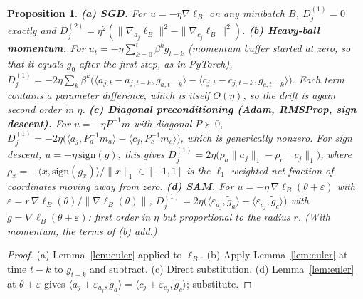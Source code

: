 \documentclass[10pt]{article}
\newtheorem{proposition}{Proposition}
\theoremstyle{remark}
\begin{document}
\begin{proposition}\label{prop:drift}
\textbf{(a) SGD.} For $u=-\eta\nabla\ell_B$ on any minibatch $B$, $D^{(1)}_j=0$ exactly and $D^{(2)}_j=\eta^2(\|\nabla_{a_j}\ell_B\|^2-\|\nabla_{c_j}\ell_B\|^2)$.
\textbf{(b) Heavy-ball momentum.} For $u_t=-\eta\sum_{k=0}^{t}\beta^k g_{t-k}$ (momentum buffer started at zero, so that it equals $g_0$ after the first step, as in PyTorch),
$D^{(1)}_j=-2\eta\sum_k\beta^k\big(\langle a_{j,t}-a_{j,t-k},g_{a,t-k}\rangle-\langle c_{j,t}-c_{j,t-k},g_{c,t-k}\rangle\big)$.
Each term contains a parameter difference, which is itself $O(\eta)$, so the drift is again second order in $\eta$.
\textbf{(c) Diagonal preconditioning (Adam, RMSProp, sign descent).} For $u=-\eta P^{-1}m$ with diagonal $P\succ0$,
$D^{(1)}_j=-2\eta\big(\langle a_j,P_a^{-1}m_a\rangle-\langle c_j,P_c^{-1}m_c\rangle\big)$, which is generically nonzero. For sign descent, $u=-\eta\,\mathrm{sign}(g)$, this gives $D^{(1)}_j=2\eta\big(\rho_{a}\|a_j\|_1-\rho_{c}\|c_j\|_1\big)$, where $\rho_x=-\langle x,\mathrm{sign}(g_x)\rangle/\|x\|_1\in[-1,1]$ is the $\ell_1$-weighted net fraction of coordinates moving away from zero.
\textbf{(d) SAM.} For $u=-\eta\,\nabla\ell_B(\theta+\varepsilon)$ with $\varepsilon=r\,\nabla\ell_B(\theta)/\|\nabla\ell_B(\theta)\|$, $D^{(1)}_j=2\eta\big(\langle\varepsilon_{a_j},\tilde g_{a}\rangle-\langle\varepsilon_{c_j},\tilde g_{c}\rangle\big)$ with $\tilde g=\nabla\ell_B(\theta+\varepsilon)$: first order in $\eta$ but proportional to the radius $r$. (With momentum, the terms of (b) add.)
\end{proposition}
\begin{proof}
(a) Lemma~\ref{lem:euler} applied to $\ell_B$. (b) Apply Lemma~\ref{lem:euler} at time $t-k$ to $g_{t-k}$ and subtract. (c) Direct substitution. (d) Lemma~\ref{lem:euler} at $\theta+\varepsilon$ gives $\langle a_j+\varepsilon_{a_j},\tilde g_a\rangle=\langle c_j+\varepsilon_{c_j},\tilde g_c\rangle$; substitute.
\end{proof}
\end{document}

